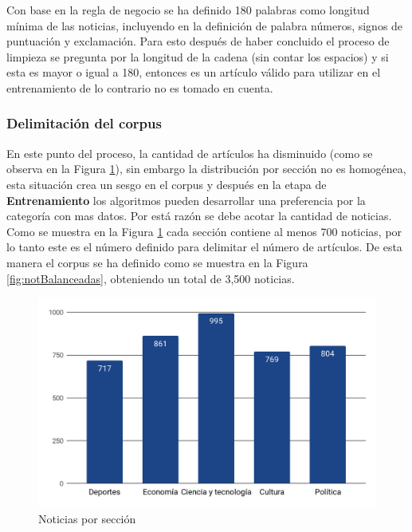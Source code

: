 Con base en la regla de negocio  se ha definido 180 palabras como longitud mínima de las noticias, incluyendo en la definición de palabra números, signos de puntuación y exclamación.
Para esto después de haber concluido el proceso de limpieza se pregunta por la longitud de la cadena (sin contar los espacios) y si esta es mayor o igual a 180, entonces es un artículo válido para utilizar en el entrenamiento de lo contrario no es tomado en cuenta.\\


\subsubsection{Delimitación del corpus}

En este punto del proceso, la cantidad de artículos ha disminuido (como se observa en la Figura \ref{fig:cp5:noticiasSecciones}), sin embargo la distribución por sección no es homogénea, esta situación crea un sesgo en el corpus y después en la etapa de \textbf{Entrenamiento} los algoritmos pueden desarrollar una preferencia por la categoría con mas datos. Por está razón se debe acotar la cantidad de noticias.\\

Como se muestra en la Figura \ref{fig:cp5:noticiasSecciones} cada sección contiene al menos 700 noticias, por lo tanto este es el número definido para delimitar el número de artículos. De esta manera el corpus se ha definido como se muestra en la Figura \ref{fig:notBalanceadas}, obteniendo un total de 3,500 noticias.\\

\begin{figure}[H]
	\centering
	\includegraphics[scale=.33]{imagenes/Capitulo5/Entrenamiento/noticiasSecciones.png}
	\caption{Noticias por sección}
	\label{fig:cp5:noticiasSecciones}
\end{figure}


